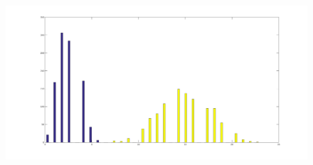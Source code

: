 \documentclass{article}
\begin{document}
\begin{figure}[H]
\centering
\includegraphics[width=\linewidth]{plot2_4.png}
\label{fig2.4}
\end{figure}
\subsection{}
\subsection{}
\subsection{}
\subsection{}
\end{document}
